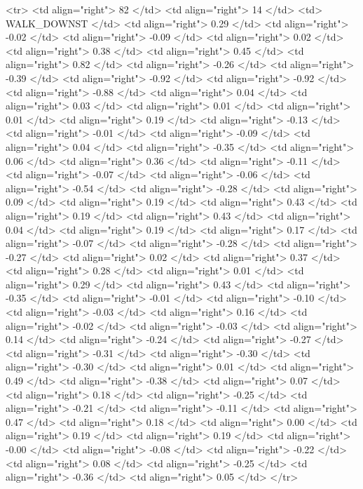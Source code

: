   <tr> <td align="right"> 82 </td> <td align="right">  14 </td> <td> WALK_DOWNST </td> <td align="right"> 0.29 </td> <td align="right"> -0.02 </td> <td align="right"> -0.09 </td> <td align="right"> 0.02 </td> <td align="right"> 0.38 </td> <td align="right"> 0.45 </td> <td align="right"> 0.82 </td> <td align="right"> -0.26 </td> <td align="right"> -0.39 </td> <td align="right"> -0.92 </td> <td align="right"> -0.92 </td> <td align="right"> -0.88 </td> <td align="right"> 0.04 </td> <td align="right"> 0.03 </td> <td align="right"> 0.01 </td> <td align="right"> 0.01 </td> <td align="right"> 0.19 </td> <td align="right"> -0.13 </td> <td align="right"> -0.01 </td> <td align="right"> -0.09 </td> <td align="right"> 0.04 </td> <td align="right"> -0.35 </td> <td align="right"> 0.06 </td> <td align="right"> 0.36 </td> <td align="right"> -0.11 </td> <td align="right"> -0.07 </td> <td align="right"> -0.06 </td> <td align="right"> -0.54 </td> <td align="right"> -0.28 </td> <td align="right"> 0.09 </td> <td align="right"> 0.19 </td> <td align="right"> 0.43 </td> <td align="right"> 0.19 </td> <td align="right"> 0.43 </td> <td align="right"> 0.04 </td> <td align="right"> 0.19 </td> <td align="right"> 0.17 </td> <td align="right"> -0.07 </td> <td align="right"> -0.28 </td> <td align="right"> -0.27 </td> <td align="right"> 0.02 </td> <td align="right"> 0.37 </td> <td align="right"> 0.28 </td> <td align="right"> 0.01 </td> <td align="right"> 0.29 </td> <td align="right"> 0.43 </td> <td align="right"> -0.35 </td> <td align="right"> -0.01 </td> <td align="right"> -0.10 </td> <td align="right"> -0.03 </td> <td align="right"> 0.16 </td> <td align="right"> -0.02 </td> <td align="right"> -0.03 </td> <td align="right"> 0.14 </td> <td align="right"> -0.24 </td> <td align="right"> -0.27 </td> <td align="right"> -0.31 </td> <td align="right"> -0.30 </td> <td align="right"> -0.30 </td> <td align="right"> 0.01 </td> <td align="right"> 0.49 </td> <td align="right"> -0.38 </td> <td align="right"> 0.07 </td> <td align="right"> 0.18 </td> <td align="right"> -0.25 </td> <td align="right"> -0.21 </td> <td align="right"> -0.11 </td> <td align="right"> 0.47 </td> <td align="right"> 0.18 </td> <td align="right"> 0.00 </td> <td align="right"> 0.19 </td> <td align="right"> 0.19 </td> <td align="right"> -0.00 </td> <td align="right"> -0.08 </td> <td align="right"> -0.22 </td> <td align="right"> 0.08 </td> <td align="right"> -0.25 </td> <td align="right"> -0.36 </td> <td align="right"> 0.05 </td> </tr>
